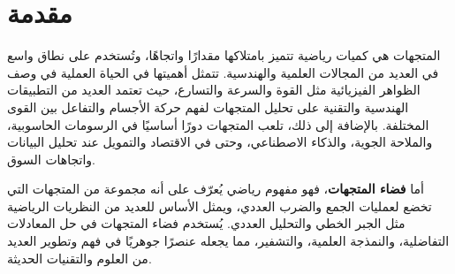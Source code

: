 \chapter*{مقدمة}
\noindent
	المتجهات هي كميات رياضية تتميز بامتلاكها مقدارًا واتجاهًا، وتُستخدم على نطاق واسع في العديد من المجالات العلمية والهندسية. تتمثل أهميتها في الحياة العملية في وصف الظواهر الفيزيائية مثل القوة والسرعة والتسارع، حيث تعتمد العديد من التطبيقات الهندسية والتقنية على تحليل المتجهات لفهم حركة الأجسام والتفاعل بين القوى المختلفة. بالإضافة إلى ذلك، تلعب المتجهات دورًا أساسيًا في الرسومات الحاسوبية، والملاحة الجوية، والذكاء الاصطناعي، وحتى في الاقتصاد والتمويل عند تحليل البيانات واتجاهات السوق.
	
	\noindent
	أما \textbf{فضاء المتجهات}، فهو مفهوم رياضي يُعرّف على أنه مجموعة من المتجهات التي تخضع لعمليات الجمع والضرب العددي، ويمثل الأساس للعديد من النظريات الرياضية مثل الجبر الخطي والتحليل العددي. يُستخدم فضاء المتجهات في حل المعادلات التفاضلية، والنمذجة العلمية، والتشفير، مما يجعله عنصرًا جوهريًا في فهم وتطوير العديد من العلوم والتقنيات الحديثة.
	

